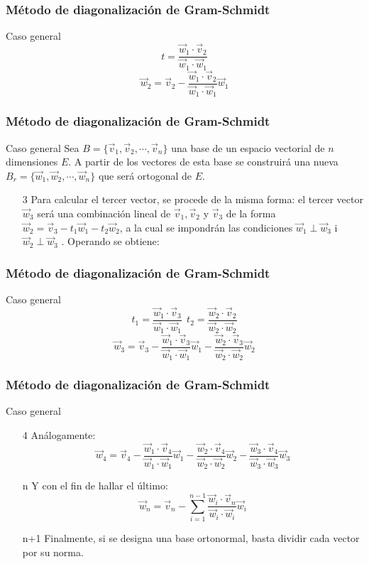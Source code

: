 \documentclass{beamer}
\begin{document}
\begin{frame}
  \frametitle{M\'etodo de diagonalizaci\'on de Gram-Schmidt}
\begin{block}{Caso general}
\[t = \frac{\vec w_1\cdot \vec v_2}{\vec w_1\cdot \vec w_1}\]
\[\vec w_2 = \vec v_2 - \frac{\vec w_1\cdot \vec v_2}{\vec w_1\cdot \vec w_1}\vec w_1\]
\end{block}
\end{frame}

\begin{frame}
  \frametitle{M\'etodo de diagonalizaci\'on de Gram-Schmidt}
\begin{block}{Caso general}
Sea $B=\{\vec v_1,\vec v_2,\cdots, \vec v_n\}$ una base de un espacio vectorial de $n$ dimensiones $E$. A partir de los vectores de esta base se construir\'a una nueva $B_r=\{\vec w_1,\vec w_2,\cdots,\vec w_n\}$ que ser\'a ortogonal de $E$.
\begin{itemize}
\item[3] Para calcular el tercer vector, se procede de la misma forma: el tercer vector $\vec w_3$ ser\'a una combinaci\'on lineal de $\vec v_1, \vec v_2$ y $\vec v_3$ de la forma $\vec w_2 = \vec v_3-t_1\vec w_1-t_2\vec w_2$, a la cual se impondr\'an las condiciones $\vec w_1\perp\vec w_3$ i $\vec w_2\perp\vec w_3$  . Operando se obtiene:
\end{itemize}
\end{block}
\end{frame}


\begin{frame}
  \frametitle{M\'etodo de diagonalizaci\'on de Gram-Schmidt}
\begin{block}{Caso general}
\[t_1 = \frac{\vec w_1\cdot \vec v_3}{\vec w_1\cdot \vec w_1}\ \ t_2 = \frac{\vec w_2\cdot \vec v_2}{\vec w_2\cdot \vec w_2}\]
\[\vec w_3 = \vec v_3 - \frac{\vec w_1\cdot \vec v_3}{\vec w_1\cdot \vec w_1}\vec w_1 - \frac{\vec w_2\cdot \vec v_3}{\vec w_2\cdot \vec w_2}\vec w_2\]
\end{block}
\end{frame}


\begin{frame}
  \frametitle{M\'etodo de diagonalizaci\'on de Gram-Schmidt}
\begin{block}{Caso general}
\begin{itemize}
\item[4] An\'alogamente:
\[\vec w_4 = \vec v_4 - \frac{\vec w_1\cdot \vec v_4}{\vec w_1\cdot \vec w_1}\vec w_1 - \frac{\vec w_2\cdot \vec v_4}{\vec w_2\cdot \vec w_2}\vec w_2 - \frac{\vec w_3\cdot \vec v_4}{\vec w_3\cdot \vec w_3}\vec w_3\]
\item[n] Y con el fin de hallar el \'ultimo:
\[\vec w_n = \vec v_n - \sum_{i=1}^{n-1} \frac{\vec w_i\cdot \vec v_n}{\vec w_i\cdot \vec w_i}\vec w_i\]
\item[n+1] Finalmente, si se designa una base ortonormal, basta dividir cada vector por su norma. 
\end{itemize}
\end{block}
\end{frame}
\end{document}
